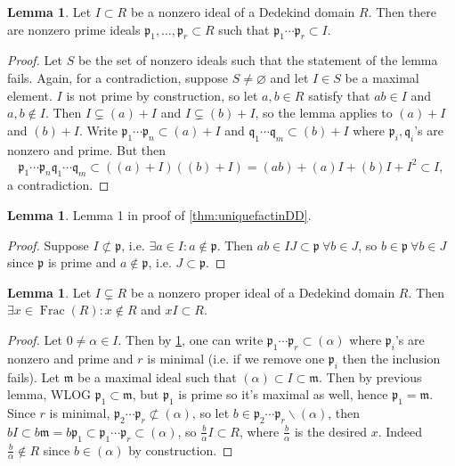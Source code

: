 \documentclass{article}
\newcommand{\Frac}{\operatorname{Frac}}
\newcommand{\ip}{\mathfrak{p}}
\newcommand{\iq}{\mathfrak{q}}
\theoremstyle{definition}
\newtheorem{lemma}[defn]{Lemma}
\begin{document}
\begin{lemma}
\label{lemma:almostfact}
Let $I\subset R$ be a nonzero ideal of a Dedekind domain $R$. Then there are nonzero prime ideals $\ip_1,\ldots,\ip_r\subset R$ such that $\ip_1\cdots\ip_r\subset I$.
\end{lemma}
\begin{proof}
Let $S$ be the set of nonzero ideals such that the statement of the lemma fails. Again, for a contradiction, suppose $S\neq\varnothing$ and let $I\in S$ be a maximal element. $I$ is not prime by construction, so let $a,b\in R$ satisfy that $ab\in I$ and $a,b\notin I$. Then $I\subsetneq (a)+I$ and $I\subsetneq (b)+I$, so the lemma applies to $(a)+I$ and $(b)+I$. Write $\ip_1\cdots\ip_n\subset(a)+I$ and $\iq_1\cdots\iq_m\subset(b)+I$ where $\ip_i,\iq_i$'s are nonzero and prime. But then
\[
\ip_1\cdots\ip_n\iq_1\cdots\iq_m\subset((a)+I)((b)+I)=(ab)+(a)I+(b)I+I^2\subset I,
\]
a contradiction.
\end{proof}

\begin{lemma}
Lemma 1 in proof of \ref{thm:uniquefactinDD}.
\end{lemma}
\begin{proof}
Suppose $I\not\subset\ip$, i.e. $\exists a\in I:a\notin\ip$. Then $ab\in IJ\subset\ip \ \forall b\in J$, so $b\in\ip \ \forall b\in J$ since $\ip$ is prime and $a\notin\ip$, i.e. $J\subset\ip$.
\end{proof}

\begin{lemma}
Let $I\subsetneq R$ be a nonzero proper ideal of a Dedekind domain $R$. Then $\exists x\in\Frac(R):x\notin R$ and $xI\subset R$.
\end{lemma}
\begin{proof}
Let $0\neq\alpha\in I$. Then by \ref{lemma:almostfact}, one can write $\ip_1\cdots\ip_r\subset(\alpha)$ where $\ip_i$'s are nonzero and prime and $r$ is minimal (i.e. if we remove one $\ip_i$ then the inclusion fails). Let $\mathfrak m$ be a maximal ideal such that $(\alpha)\subset I\subset\mathfrak m$. Then by previous lemma, WLOG $\ip_1\subset\mathfrak m$, but $\ip_1$ is prime so it's maximal as well, hence $\ip_1=\mathfrak m$. Since $r$ is minimal, $\ip_2\cdots\ip_r\not\subset (\alpha)$, so let $b\in\ip_2\cdots\ip_r\backslash(\alpha)$, then $bI\subset b\mathfrak m=b\ip_1\subset\ip_1\cdots\ip_r\subset(\alpha)$, so $\frac{b}{\alpha}I\subset R$, where $\frac{b}{\alpha}$ is the desired $x$. Indeed $\frac{b}{\alpha}\notin R$ since $b\in(\alpha)$ by construction.
\end{proof}
\end{document}

